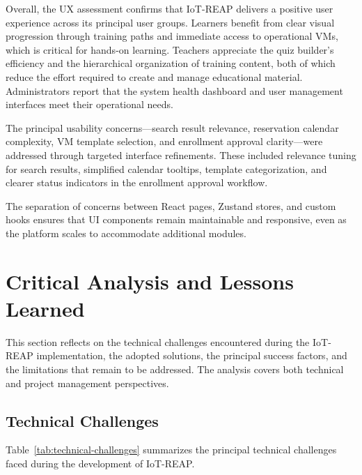Overall, the UX assessment confirms that IoT-REAP delivers a positive user experience across its principal user groups. Learners benefit from clear visual progression through training paths and immediate access to operational VMs, which is critical for hands-on learning. Teachers appreciate the quiz builder's efficiency and the hierarchical organization of training content, both of which reduce the effort required to create and manage educational material. Administrators report that the system health dashboard and user management interfaces meet their operational needs.

The principal usability concerns---search result relevance, reservation calendar complexity, VM template selection, and enrollment approval clarity---were addressed through targeted interface refinements. These included relevance tuning for search results, simplified calendar tooltips, template categorization, and clearer status indicators in the enrollment approval workflow.

The separation of concerns between React pages, Zustand stores, and custom hooks ensures that UI components remain maintainable and responsive, even as the platform scales to accommodate additional modules.

\section{Critical Analysis and Lessons Learned}

This section reflects on the technical challenges encountered during the IoT-REAP implementation, the adopted solutions, the principal success factors, and the limitations that remain to be addressed. The analysis covers both technical and project management perspectives.

\subsection{Technical Challenges}

Table~\ref{tab:technical-challenges} summarizes the principal technical challenges faced during the development of IoT-REAP.

